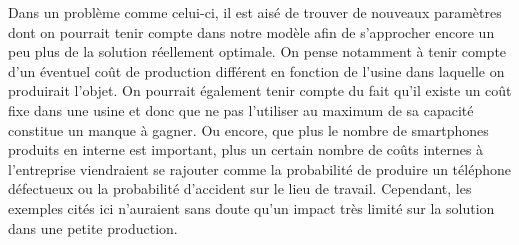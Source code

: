 Dans un problème comme celui-ci, il est aisé de trouver de nouveaux paramètres dont on pourrait tenir compte dans notre modèle afin de s'approcher encore un peu plus de la solution réellement optimale. On pense notamment à tenir compte d'un éventuel coût de production différent en fonction de l'usine dans laquelle on produirait l'objet. On pourrait également tenir compte du fait qu'il existe un coût fixe dans une usine et donc que ne pas l'utiliser au maximum de sa capacité constitue un manque à gagner. Ou encore, que plus le nombre de smartphones produits en interne est important, plus un certain nombre de coûts internes à l'entreprise viendraient se rajouter comme la probabilité de produire un téléphone défectueux ou la probabilité d'accident sur le lieu de travail. Cependant, les exemples cités ici n'auraient sans doute qu'un impact très limité sur la solution dans une petite production.